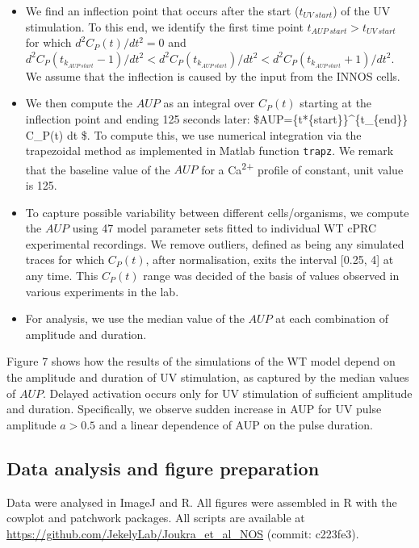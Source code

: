 \documentclass[
  10pt,
  onecolumn]{article}
\providecommand{\tightlist}{%
  \setlength{\itemsep}{0pt}\setlength{\parskip}{0pt}}
\begin{document}
\begin{itemize}
\tightlist
\item
  We find an inflection point that occurs after the start
  (\(t_{UV\: start}\)) of the UV stimulation. To this end, we identify
  the first time point \(t_{AUP\: start}>t_{UV\: start}\) for which
  \(d^2C_P(t)/dt^2=0\) and
  \(d^2C_P(t_{k_{AUP\: start}}-1)/dt^2<d^2C_P(t_{k_{AUP\: start}})/dt^2<d^2C_P(t_{k_{AUP\: start}}+1)/dt^2\).
  We assume that the inflection is caused by the input from the INNOS
  cells.
\item
  We then compute the \(AUP\) as an integral over \(C_P(t)\) starting at
  the inflection point and ending 125 seconds later:
  \$AUP=\int*\{t*\{start\}\}\^{}\{t\_\{end\}\} C\_P(t) dt \$. To compute
  this, we use numerical integration via the trapezoidal method as
  implemented in Matlab function \texttt{trapz}. We remark that the
  baseline value of the \(AUP\) for a Ca\textsuperscript{2+} profile of
  constant, unit value is 125.
\item
  To capture possible variability between different cells/organisms, we
  compute the \(AUP\) using 47 model parameter sets fitted to individual
  WT cPRC experimental recordings. We remove outliers, defined as being
  any simulated traces for which \(C_P(t)\), after normalisation, exits
  the interval {[}0.25, 4{]} at any time. This \(C_P(t)\) range was
  decided of the basis of values observed in various experiments in the
  lab.
\item
  For analysis, we use the median value of the \(AUP\) at each
  combination of amplitude and duration.
\end{itemize}

Figure 7 shows how the results of the simulations of the WT model depend
on the amplitude and duration of UV stimulation, as captured by the
median values of \(AUP\). Delayed activation occurs only for UV
stimulation of sufficient amplitude and duration. Specifically, we
observe sudden increase in AUP for UV pulse amplitude \(a>0.5\) and a
linear dependence of AUP on the pulse duration.

\hypertarget{data-analysis-and-figure-preparation}{%
\subsection{Data analysis and figure
preparation}\label{data-analysis-and-figure-preparation}}

Data were analysed in ImageJ and R. All figures were assembled in R with
the cowplot and patchwork packages. All scripts are available at
\url{https://github.com/JekelyLab/Joukra_et_al_NOS} (commit: c223fe3).
\end{document}
